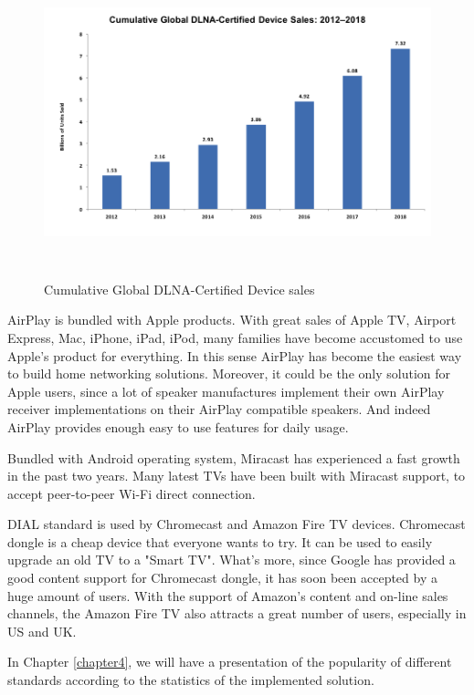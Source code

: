 \begin{figure}[htb] 
\centering \includegraphics[height=9cm]{charts/dlna_market} 
\caption{Cumulative Global DLNA-Certified Device sales \label{dlna_market}} 
\end{figure}
 
AirPlay is bundled with Apple products. With great sales of Apple TV, Airport Express, 
Mac, iPhone, iPad, iPod, many families have become accustomed to use Apple's
product for everything. In this sense AirPlay has become the easiest way to
build home networking solutions. Moreover, it could be the only solution for
Apple users, since a lot of speaker manufactures implement their own AirPlay
receiver implementations on their AirPlay compatible speakers. And indeed
AirPlay provides enough easy to use features for daily usage.

Bundled with Android operating system, Miracast has experienced a fast growth in 
the past two years. Many latest TVs have been built with Miracast support, to accept peer-to-peer Wi-Fi direct connection.

DIAL standard is used by Chromecast and Amazon Fire TV devices. Chromecast
dongle is a cheap device that everyone wants to try. It can be used to easily
upgrade an old TV to a "Smart TV".  What's more, since Google has provided a
good content support for Chromecast dongle, it has soon been accepted by a huge
amount of users. With the support of Amazon's content and on-line sales
channels, the Amazon Fire TV also attracts a great number of users, especially
in US and UK.

In Chapter \ref{chapter4}, we will have a presentation of the popularity of
different standards according to the statistics of the implemented solution.
